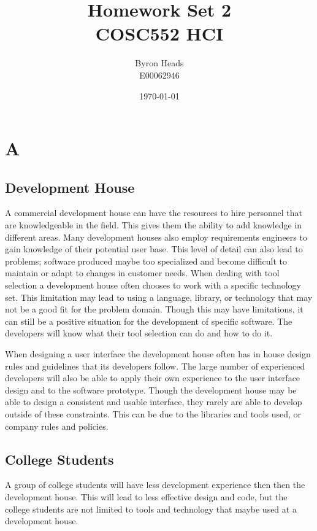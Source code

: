 \documentclass[12pt]{article}
\title{Homework Set 2 \\
    COSC552 HCI}
\author{ Byron Heads \\
    E00062946 }
\date{\today}
\begin{document}
\maketitle

\section*{A}

\subsection*{Development House}
A commercial development house can have the resources to hire personnel
that are knowledgeable in the field.  This gives
them the ability to add knowledge in different areas.  Many development 
houses also employ requirements engineers to
gain knowledge of their potential user base.  This level of detail can
also lead to problems; software produced maybe too specialized and
become difficult to maintain or adapt to changes in customer needs.
When dealing with tool selection a development house often chooses
to work with a specific technology set.  This limitation may lead to
using a language, library, or technology that may not
be a good fit for the problem domain.  Though this may have limitations,
it can still be a positive situation for the development of specific  
software.  The developers will know what their tool selection can do
and how to do it.

When designing a user interface the development house often has in house
design rules and guidelines that its developers follow.  The large number
of experienced developers will also be able to apply their own experience 
to the user interface design and to the software prototype.  Though the 
development house may be able to design a consistent and usable interface,
they rarely are able to develop outside of these constraints.  This can
be due to the libraries and tools used, or company rules and policies. 

\subsection*{College Students}

A group of college students will have less development experience then
then the development house.  This will lead to less effective design and
code, but the college students are not limited to tools and technology 
that maybe used at a development house.  
\end{document}
